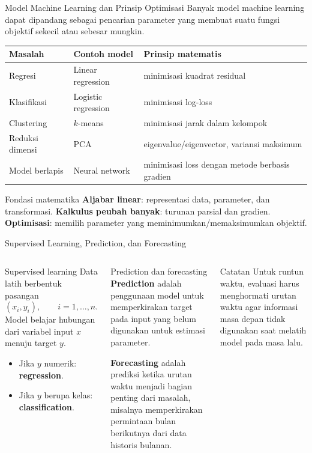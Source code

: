 \documentclass[aspectratio=169,11pt]{beamer}
\begin{document}
\begin{frame}{Model Machine Learning dan Prinsip Optimisasi}
\footnotesize
Banyak model machine learning dapat dipandang sebagai pencarian parameter yang membuat suatu fungsi objektif sekecil atau sebesar mungkin.
\begin{center}
\renewcommand{\arraystretch}{1.12}
\begin{tabular}{p{2.2cm}p{3.2cm}p{5.4cm}}
\toprule
\textbf{Masalah} & \textbf{Contoh model} & \textbf{Prinsip matematis} \\ \midrule
Regresi & Linear regression & minimisasi kuadrat residual \\
Klasifikasi & Logistic regression & minimisasi log-loss \\
Clustering & $k$-means & minimisasi jarak dalam kelompok \\
Reduksi dimensi & PCA & eigenvalue/eigenvector, variansi maksimum \\
Model berlapis & Neural network & minimisasi loss dengan metode berbasis gradien \\
\bottomrule
\end{tabular}
\end{center}
\begin{alertblock}{Fondasi matematika}
\textbf{Aljabar linear}: representasi data, parameter, dan transformasi.\quad
\textbf{Kalkulus peubah banyak}: turunan parsial dan gradien.\quad
\textbf{Optimisasi}: memilih parameter yang meminimumkan/memaksimumkan objektif.
\end{alertblock}
\end{frame}

\begin{frame}{Supervised Learning, Prediction, dan Forecasting}
\begin{columns}[T]
\begin{block}{Supervised learning}
\small
Data latih berbentuk pasangan
\[
(x_i,y_i),\qquad i=1,\ldots,n.
\]
Model belajar hubungan dari variabel input $x$ menuju target $y$.
\begin{itemize}
  \item Jika $y$ numerik: \textbf{regression}.
  \item Jika $y$ berupa kelas: \textbf{classification}.
\end{itemize}
\end{block}
\begin{block}{Prediction dan forecasting}
\small
\textbf{Prediction} adalah penggunaan model untuk memperkirakan target pada input yang belum digunakan untuk estimasi parameter.

\medskip
\textbf{Forecasting} adalah prediksi ketika urutan waktu menjadi bagian penting dari masalah, misalnya memperkirakan permintaan bulan berikutnya dari data historis bulanan.
\end{block}
\begin{alertblock}{Catatan}
Untuk runtun waktu, evaluasi harus menghormati urutan waktu agar informasi masa depan tidak digunakan saat melatih model pada masa lalu.
\end{alertblock}
\end{columns}
\end{frame}
\end{document}

